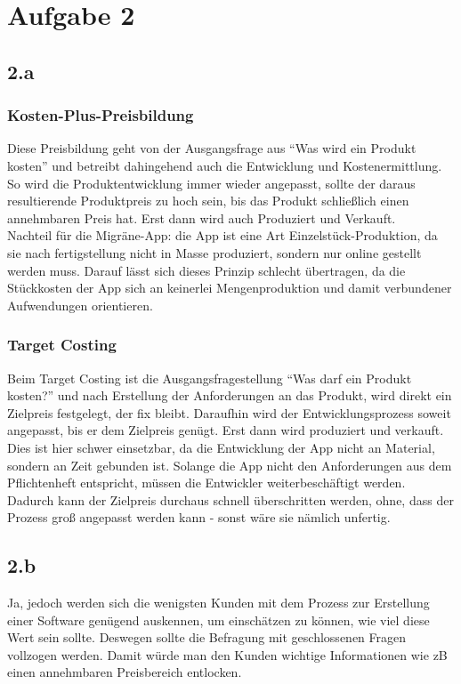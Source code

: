 \documentclass{article}
\begin{document}
\section{Aufgabe 2}
\subsection{2.a}
\subsubsection{Kosten-Plus-Preisbildung}
Diese Preisbildung geht von der Ausgangsfrage aus "`Was wird ein Produkt kosten"' und betreibt dahingehend auch die Entwicklung und Kostenermittlung. So wird die Produktentwicklung immer wieder angepasst, sollte der daraus resultierende Produktpreis zu hoch sein, bis das Produkt schließlich einen annehmbaren Preis hat. Erst dann wird auch Produziert und Verkauft.\\
Nachteil für die Migräne-App: die App ist eine Art Einzelstück-Produktion, da sie nach fertigstellung nicht in Masse produziert, sondern nur online gestellt werden muss. Darauf lässt sich dieses Prinzip schlecht übertragen, da die Stückkosten der App sich an keinerlei Mengenproduktion und damit verbundener Aufwendungen orientieren.

\subsubsection{Target Costing}
Beim Target Costing ist die Ausgangsfragestellung "`Was darf ein Produkt kosten?"' und nach Erstellung der Anforderungen an das Produkt, wird direkt ein Zielpreis festgelegt, der fix bleibt. Daraufhin wird der Entwicklungsprozess soweit angepasst, bis er dem Zielpreis genügt. Erst dann wird produziert und verkauft.\\
Dies ist hier schwer einsetzbar, da die Entwicklung der App nicht an Material, sondern an Zeit gebunden ist. Solange die App nicht den Anforderungen aus dem Pflichtenheft entspricht, müssen die Entwickler weiterbeschäftigt werden. Dadurch kann der Zielpreis durchaus schnell überschritten werden, ohne, dass der Prozess groß angepasst werden kann - sonst wäre sie nämlich unfertig.

\subsection{2.b}
Ja, jedoch werden sich die wenigsten Kunden mit dem Prozess zur Erstellung einer Software genügend auskennen, um einschätzen zu können, wie viel diese Wert sein sollte. Deswegen sollte die Befragung mit geschlossenen Fragen vollzogen werden. Damit würde man den Kunden wichtige Informationen wie zB einen annehmbaren Preisbereich entlocken.
\end{document}
